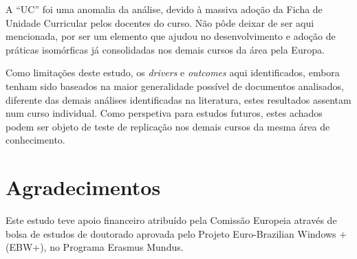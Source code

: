 \documentclass{textolivre}
\begin{document}
A “UC” foi uma anomalia da análise, devido à massiva adoção da Ficha de Unidade Curricular pelos docentes do curso. Não pôde deixar de ser aqui mencionada, por ser um elemento que ajudou no desenvolvimento e adoção de práticas isomórficas já consolidadas nos demais cursos da área pela Europa.  

Como limitações deste estudo, os \textit{drivers} e \textit{outcomes} aqui identificados, embora tenham sido baseados na maior generalidade possível de documentos analisados, diferente das demais análises identificadas na literatura, estes resultados assentam num curso individual. Como perspetiva para estudos futuros, estes achados podem ser objeto de teste de replicação nos demais cursos da mesma área de conhecimento.

\section{Agradecimentos}\label{sec-agradecimentos}
Este estudo teve apoio financeiro atribuído pela Comissão Europeia através de bolsa de estudos de doutorado aprovada pelo Projeto Euro-Brazilian Windows + (EBW+), no Programa Erasmus Mundus.

\printbibliography\label{sec-bib}
\end{document}
